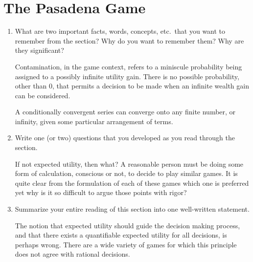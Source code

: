 \documentclass[a4paper, 12pt]{config/homework}
\begin{document}
\section{The Pasadena Game}
\begin{enumerate}[label=\roman*.]
\item What are two important facts, words, concepts, etc.\ that you want to remember from the section? Why do you want to remember them? Why are they significant?

Contamination, in the game context, refers to a miniscule probability being assigned to a possibly infinite utility gain. There is no possible probability, other than 0, that permits a decision to be made when an infinite wealth gain can be considered.

A conditionally convergent series can converge onto any finite number, or infinity, given some particular arrangement of terms.

\item Write one (or two) questions that you developed as you read through the section.

If not expected utility, then what? A reasonable person must be doing some form of calculation, conscious or not, to decide to play similar games. It is quite clear from the formulation of each of these games which one is preferred yet why is it so difficult to argue those points with rigor?

\item Summarize your entire reading of this section into one well-written statement.

The notion that expected utility should guide the decision making process, and that there exists a quantifiable expected utility for all decisions, is perhaps wrong. There are a wide variety of games for which this principle does not agree with rational decisions.

\end{enumerate}
\end{document}
